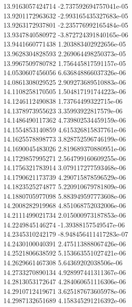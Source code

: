 {13.9163057424714 -2.737592694757041e-05 \\
13.9201172963632 -2.993165435327683e-05 \\
13.9263172937801 -2.235776992165484e-05 \\
13.9347840580972 -3.872724391840165e-06 \\
13.9441660771438 1.203883402922656e-05 \\
13.9628304828593 2.269064498250373e-05 \\
13.9967509780782 1.756445817591157e-05 \\
14.0530607456056 6.636848866037326e-06 \\
14.0861308029525 2.909273689510883e-06 \\
14.1108258170505 1.504817191744223e-06 \\
14.1246112490838 1.73764499322715e-06 \\
14.1378973955623 3.35993922817579e-06 \\
14.1486490117362 4.739802534459159e-06 \\
14.1554853140859 4.615326815837761e-06 \\
14.1625578898773 3.828752596746199e-06 \\
14.1690045483026 2.819689370880951e-06 \\
14.1729857995271 2.564799160609255e-06 \\
14.1756321783914 3.079117277593468e-06 \\
14.1790621173739 4.290715878596529e-06 \\
14.1823525274877 5.220910679781809e-06 \\
14.1880705977098 5.883949597773608e-06 \\
14.2008282919968 4.851068752032006e-06 \\
14.2111499021734 2.015000973187853e-06 \\
14.2249845146274 -1.39388157549547e-06 \\
14.2345310242179 -8.948456411417283e-07 \\
14.2430100040391 2.475113888067426e-06 \\
14.2521806638592 5.153663551027421e-06 \\
14.2629661467308 5.64369202038506e-06 \\
14.2733270890134 4.928997441311367e-06 \\
14.2813053172647 4.284060651116306e-06 \\
14.2910712419671 3.625187673605978e-06 \\
14.2987132651689 4.158345291216392e-06 \\
}
